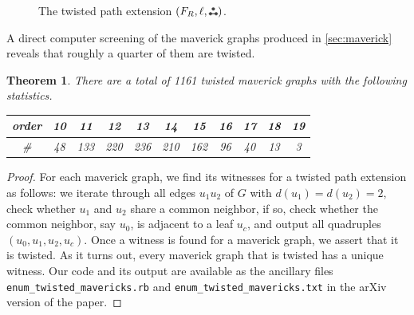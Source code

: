 \documentclass[11pt]{article}
\newtheorem{theorem}{Theorem}[section]
\theoremstyle{definition}
\theoremstyle{remark}
\newcommand{\computer}{\tikz[scale=0.28, baseline=0.1ex, transform shape]{\draw[rounded corners=0.02] (0.15, 0.45) rectangle (0.85, 0.85) {};\draw[rounded corners=0.02] (0, 0.3) rectangle (1, 1) {};\draw[rounded corners=0.02] (0, 0) rectangle (1, 0.2) {};\draw (0.2,0.1) -- (0.3,0.1);\draw (0.5,0.1) -- (0.8,0.1);}}
\newenvironment{cproof}[1][Proof]{\begin{proof}[#1]\renewcommand*{\qedsymbol}{\(\computer\)}}{\end{proof}}
\newcommand{\ftwo}{\tikz[baseline=-0.2ex, scale=0.9]{\draw[darkgray, thick] (0,0)--(0.2,0); \draw[darkgray, fill=darkgray] (0,0) circle (0.05); \draw[darkgray, fill=darkgray] (0.1,0.17320508075) circle (0.05); \draw[darkgray, fill=darkgray] (0.2,0) circle (0.05);}}
\newcommand{\tpe}[1]{(#1,\ftwo)}
\begin{document}
\begin{figure}
    \centering
    \caption[The twisted path extension.]{The twisted path extension $\tpe{F_R, \ell}$.} \label{fig:twisted}
\end{figure}

A direct computer screening of the maverick graphs produced in \cref{sec:maverick} reveals that roughly a quarter of them are twisted.

\begin{theorem} \label{thm:main4}
    There are a total of 1161 twisted maverick graphs with the following statistics.
    \begin{center}
        \begin{tabular}{ccccccccccc}
            order  & 10 & 11 & 12 & 13 & 14 & 15 & 16 & 17 & 18 & 19 \\
            \hline
            \# & 48 & 133 & 220 & 236 & 210 & 162 & 96 & 40 & 13 & 3
        \end{tabular}
    \end{center}
\end{theorem}

\begin{cproof}
    For each maverick graph, we find its witnesses for a twisted path extension as follows: we iterate through all edges $u_1u_2$ of $G$ with $d(u_1) = d(u_2) = 2$, check whether $u_1$ and $u_2$ share a common neighbor, if so, check whether the common neighbor, say $u_0$, is adjacent to a leaf $u_c$, and output all quadruples $(u_0, u_1, u_2, u_c)$. Once a witness is found for a maverick graph, we assert that it is twisted. As it turns out, every maverick graph that is twisted has a unique witness. Our code and its output are available as the ancillary files \texttt{enum\_twisted\_mavericks.rb} and \texttt{enum\_twisted\_mavericks.txt} in the arXiv version of the paper.
\end{cproof}
\end{document}
